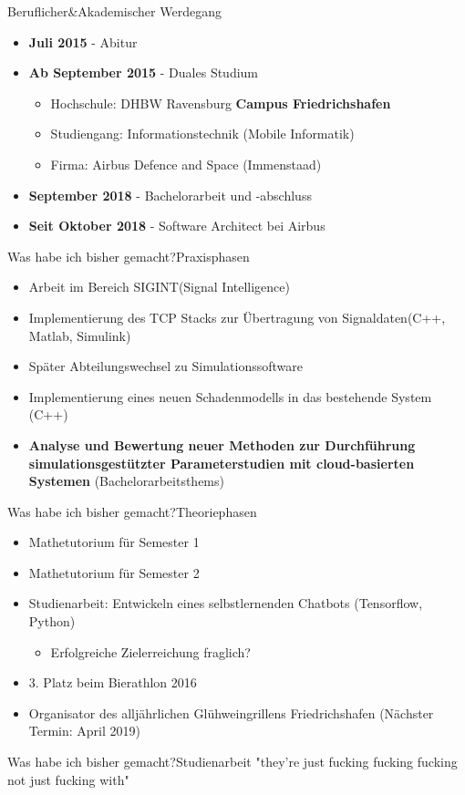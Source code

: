 	\begin{frame}{Beruflicher\&Akademischer Werdegang}{}
		\begin{itemize}
			\item \textbf{Juli 2015} - Abitur
			\item \textbf{Ab September 2015} - Duales Studium
			\begin{itemize}
				\item Hochschule: DHBW Ravensburg \textbf{Campus Friedrichshafen}
				\item Studiengang: Informationstechnik (Mobile Informatik)
				\item Firma: Airbus Defence and Space (Immenstaad)
			\end{itemize}
			\item \textbf{September 2018} - Bachelorarbeit und -abschluss
			\item \textbf{Seit Oktober 2018} - Software Architect bei Airbus
		\end{itemize}
	\end{frame}
	
	\begin{frame}{Was habe ich bisher gemacht?}{Praxisphasen}
			\begin{itemize}
				\item Arbeit im Bereich SIGINT(Signal Intelligence)
				\item Implementierung des TCP Stacks zur Übertragung von Signaldaten(C++, Matlab, Simulink)
				\item Später Abteilungswechsel zu Simulationssoftware
				\item Implementierung eines neuen Schadenmodells in das bestehende System (C++)
				\item \textbf{Analyse und Bewertung neuer Methoden zur Durchführung simulationsgestützter Parameterstudien mit cloud-basierten Systemen} (Bachelorarbeitsthems)
			\end{itemize}
	\end{frame}
	
	\begin{frame}{Was habe ich bisher gemacht?}{Theoriephasen}
		\begin{itemize}
			\item Mathetutorium für Semester 1
			\item Mathetutorium für Semester 2
			\item Studienarbeit: Entwickeln eines selbstlernenden Chatbots (Tensorflow, Python)
			\begin{itemize}
				\item Erfolgreiche Zielerreichung fraglich?
			\end{itemize}
			\item 3. Platz beim Bierathlon 2016
			\item Organisator des alljährlichen Glühweingrillens Friedrichshafen (Nächster Termin: April 2019)
		\end{itemize}
	\end{frame}
	
	\begin{frame}{Was habe ich bisher gemacht?}{Studienarbeit}
		"they're just fucking fucking fucking not just fucking with"
	\end{frame}
